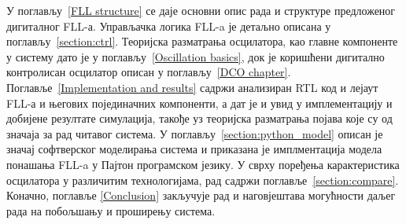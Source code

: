 \documentclass[master]{finthesis}
\def \FLL  {FLL} %
\begin{document}
У поглављу~\ref{FLL structure} се даје основни опис рада и структуре предложеног дигиталног \FLL-а. Управљачка логика \FLL-a је детаљно описана у поглављу~\ref{section:ctrl}. Теоријска разматрања осцилатора, као главне компоненте у систему дато је у поглављу~\ref{Oscillation basics}, док је коришћени дигитално контролисан осцилатор описан у поглављу~\ref{DCO chapter}. Поглавље~\ref{Implementation and results} садржи анализиран RTL код и лејаут \FLL-а и његових појединачних компоненти, а дат је и увид у имплементацију и добијене резултате симулација, такође уз теоријска разматрања појава које су од значаја за рад читавог система. У поглављу~\ref{section:python_model} описан је значај софтверског моделирања система и приказана је имплментација модела понашања \FLL-a у Пајтон програмском језику. У сврху поређења карактеристика осцилатора у различитим технологијама, рад садржи поглавље~\ref{section:compare}. Коначно, поглавље \ref{Conclusion} закључује рад и наговјештава могућности даљег рада на побољшању и проширењу система.
\end{document}
